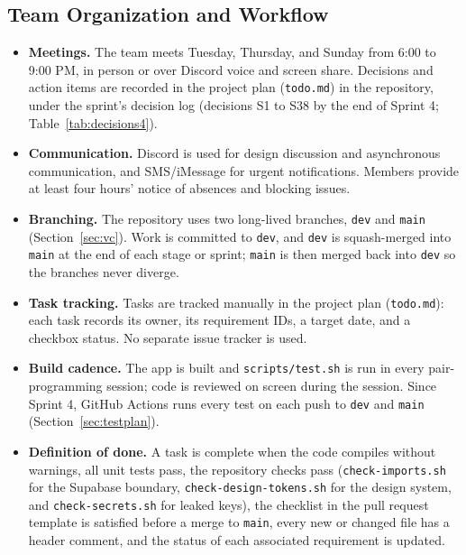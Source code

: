 \documentclass[12pt,letterpaper]{article}
\begin{document}
\subsection{Team Organization and Workflow}
\begin{itemize}
  \item \textbf{Meetings.} The team meets Tuesday, Thursday, and Sunday from 6:00 to
        9:00 PM, in person or over Discord voice and screen share. Decisions and
        action items are recorded in the project plan (\texttt{todo.md}) in the
        repository, under the sprint's decision log (decisions S1 to S38 by the end
        of Sprint 4; Table~\ref{tab:decisions4}).
  \item \textbf{Communication.} Discord is used for design discussion and asynchronous
        communication, and SMS/iMessage for urgent notifications. Members provide at
        least four hours' notice of absences and blocking issues.
  \item \textbf{Branching.} The repository uses two long-lived branches, \texttt{dev}
        and \texttt{main} (Section~\ref{sec:vc}). Work is committed to \texttt{dev},
        and \texttt{dev} is squash-merged into \texttt{main} at the end of each stage
        or sprint; \texttt{main} is then merged back into \texttt{dev} so the branches
        never diverge.
  \item \textbf{Task tracking.} Tasks are tracked manually in the project plan
        (\texttt{todo.md}): each task records its owner, its requirement IDs, a
        target date, and a checkbox status. No separate issue tracker is used.
  \item \textbf{Build cadence.} The app is built and \texttt{scripts/test.sh} is run
        in every pair-programming session; code is reviewed on screen during the
        session. Since Sprint 4, GitHub Actions runs every test on each push to
        \texttt{dev} and \texttt{main} (Section~\ref{sec:testplan}).
  \item \textbf{Definition of done.} A task is complete when the code compiles without
        warnings, all unit tests pass, the repository checks pass
        (\texttt{check-imports.sh} for the Supabase boundary,
        \texttt{check-design-tokens.sh} for the design system, and
        \texttt{check-secrets.sh} for leaked keys), the checklist in the pull request
        template is satisfied before a merge to \texttt{main}, every new or changed file has a header comment, and the status of
        each associated requirement is updated.
\end{itemize}
\end{document}
